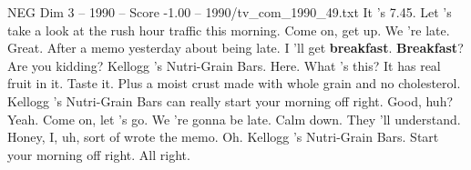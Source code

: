\begin{textsample}{NEG Dim 3 – 1990 – Score -1.00 – 1990/tv\_com\_1990\_49.txt}  \label{ex:f3_neg_022}
It 's 7.45.
Let 's take a look at the rush hour traffic this morning.
Come on, get up.
We 're late.
Great.
After a memo yesterday about being late.
I 'll get \textbf{breakfast}. \textbf{Breakfast}?
Are you kidding?
Kellogg 's Nutri-Grain Bars.
Here.
What 's this?
It has real fruit in it.
Taste it.
Plus a moist crust made with whole grain and no cholesterol.
Kellogg 's Nutri-Grain Bars can really start your morning off right.
Good, huh?
Yeah.
Come on, let 's go.
We 're gonna be late.
Calm down.
They 'll understand.
Honey, I, uh, sort of wrote the memo.
Oh.
Kellogg 's Nutri-Grain Bars.
Start your morning off right.
All right.

\end{textsample}
